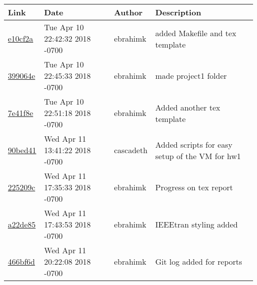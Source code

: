 \begin{tabular}{l l l l}\textbf{Link} & \textbf{Date} & \textbf{Author} & \textbf{Description}\\\hline
\href{https://github.com/ebrahimk/CS444/commit/e10cf2a5be3cb7528d156eb991bb4ee94c5ac0f3}{e10cf2a} & Tue Apr 10 22:42:32 2018 -0700 & ebrahimk & added Makefile and tex template\\\hline
\href{https://github.com/ebrahimk/CS444/commit/399064e4a3c386c1aed3ebf025f2e964411049fb}{399064e} & Tue Apr 10 22:45:33 2018 -0700 & ebrahimk & made project1 folder\\\hline
\href{https://github.com/ebrahimk/CS444/commit/7e41f8e334d9b67756aa7fb715773a4360e83a3b}{7e41f8e} & Tue Apr 10 22:51:18 2018 -0700 & ebrahimk & Added another tex template\\\hline
\href{https://github.com/ebrahimk/CS444/commit/90bed413ed27774ee7f3d84703ea90d9f32e4484}{90bed41} & Wed Apr 11 13:41:22 2018 -0700 & cascadeth & Added scripts for easy setup of the VM for hw1\\\hline
\href{https://github.com/ebrahimk/CS444/commit/225209cf1bb27caaab8d148d66ad2cebcc347828}{225209c} & Wed Apr 11 17:35:33 2018 -0700 & ebrahimk & Progress on tex report\\\hline
\href{https://github.com/ebrahimk/CS444/commit/a22de85663bb053c8335c5e3592ea39b65c292a0}{a22de85} & Wed Apr 11 17:43:53 2018 -0700 & ebrahimk & IEEEtran styling added\\\hline
\href{https://github.com/ebrahimk/CS444/commit/466bf6d68d7bb5055f687bad89014f47d1a98575}{466bf6d} & Wed Apr 11 20:22:08 2018 -0700 & ebrahimk & Git log added for reports\\\hline\end{tabular}
